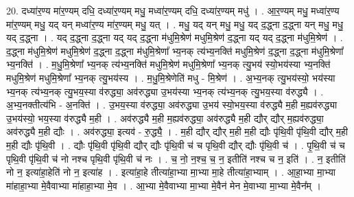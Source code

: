 \documentclass[17pt]{extarticle}
\begin{document}
20. दध्या॑र॒ण्य मा॑र॒ण्यम् दधि॒ दध्या॑र॒ण्यम् मधु॒ मध्वा॑र॒ण्यम् दधि॒ दध्या॑र॒ण्यम् मधु॑ । . आ॒र॒ण्यम् मधु॒ मध्वा॑र॒ण्य मा॑र॒ण्यम् मधु॒ यद् यन् मध्वा॑र॒ण्य मा॑र॒ण्यम् मधु॒ यत् । . मधु॒ यद् यन् मधु॒ मधु॒ यद् द॒द्ध्ना द॒द्ध्ना यन् मधु॒ मधु॒ यद् द॒द्ध्ना । . यद् द॒द्ध्ना द॒द्ध्ना यद् यद् द॒द्ध्ना म॑धुमि॒श्रेण॑ मधुमि॒श्रेण॑ द॒द्ध्ना यद् यद् द॒द्ध्ना म॑धुमि॒श्रेण॑ । . द॒द्ध्ना म॑धुमि॒श्रेण॑ मधुमि॒श्रेण॑ द॒द्ध्ना द॒द्ध्ना म॑धुमि॒श्रेणा᳚ भ्य॒नक् त्य॑भ्य॒नक्ति॑ मधुमि॒श्रेण॑ द॒द्ध्ना द॒द्ध्ना म॑धुमि॒श्रेणा᳚ भ्य॒नक्ति॑ । . म॒धु॒मि॒श्रेणा᳚ भ्य॒नक् त्य॑भ्य॒नक्ति॑ मधुमि॒श्रेण॑ मधुमि॒श्रेणा᳚ भ्य॒नक् त्यु॒भय॑ स्यो॒भय॑स्या भ्य॒नक्ति॑ मधुमि॒श्रेण॑ मधुमि॒श्रेणा᳚ भ्य॒नक् त्यु॒भय॑स्य । . म॒धु॒मि॒श्रेणेति॑ मधु - मि॒श्रेण॑ । . अ॒भ्य॒नक् त्यु॒भय॑स्यो॒ भय॑स्या भ्य॒नक् त्य॑भ्य॒नक् त्यु॒भय॒स्या व॑रुद्ध्या॒ अव॑रुद्ध्या उ॒भय॑स्या भ्य॒नक् त्य॑भ्य॒नक् त्यु॒भय॒स्या व॑रुद्ध्यै । . अ॒भ्य॒नक्तीत्य॑भि - अ॒नक्ति॑ । . उ॒भय॒स्या व॑रुद्ध्या॒ अव॑रुद्ध्या उ॒भय॑ स्यो॒भय॒स्या व॑रुद्ध्यै म॒ही म॒ह्यव॑रुद्ध्या उ॒भय॑स्यो॒ भय॒स्या व॑रुद्ध्यै म॒ही । . अव॑रुद्ध्यै म॒ही म॒ह्यव॑रुद्ध्या॒ अव॑रुद्ध्यै म॒ही द्यौर् द्यौर् म॒ह्यव॑रुद्ध्या॒ अव॑रुद्ध्यै म॒ही द्यौः । . अव॑रुद्ध्या॒ इत्यव॑ - रु॒द्ध्यै॒ । . म॒ही द्यौर् द्यौर् म॒ही म॒ही द्यौः पृ॑थि॒वी पृ॑थि॒वी द्यौर् म॒ही म॒ही द्यौः पृ॑थि॒वी । . द्यौः पृ॑थि॒वी पृ॑थि॒वी द्यौर् द्यौः पृ॑थि॒वी च॑ च पृथि॒वी द्यौर् द्यौः पृ॑थि॒वी च॑ । . पृ॒थि॒वी च॑ च पृथि॒वी पृ॑थि॒वी च॑ नो नश्च पृथि॒वी पृ॑थि॒वी च॑ नः । . च॒ नो॒ न॒श्च॒ च॒ न॒ इतीति॑ नश्च च न॒ इति॑ । . न॒ इतीति॑ नो न॒ इत्या॑हा॒हेति॑ नो न॒ इत्या॑ह । . इत्या॑हा॒हे तीत्या॑हा॒भ्या मा॒भ्या मा॒हे तीत्या॑हा॒भ्याम् । . आ॒हा॒भ्या मा॒भ्या मा॑हाहा॒भ्या मे॒वैवाभ्या मा॑हाहा॒भ्या मे॒व । . आ॒भ्या मे॒वैवाभ्या मा॒भ्या मे॒वैन॑ मेन मे॒वाभ्या मा॒भ्या मे॒वैन᳚म् । \newline
\end{document}
